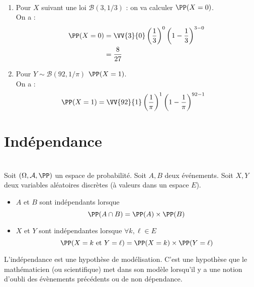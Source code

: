\documentclass[12pt,fleqn]{report} %
\begin{document}
\begin{example}
	\begin{example}\text{ }\\
		\begin{enumerate}
			\item Pour $X$ suivant une loi $\mathcal{B}(3,1/3)$ : on va calculer $\PP(X = 0)$. \\
			On a : 
			\begin{align*}
			\PP(X = 0) & = \VV{3}{0}\left(\frac{1}{3}\right)^0 \left(1 - \frac{1}{3}\right)^{3 - 0} \\ 
			& = \frac{8}{27}
			\end{align*}
			\item Pour $Y \sim \mathcal{B}(92,1/\pi)$ $\PP(X = 1)$.\\
			On a :
			\begin{align*}
			\PP(X = 1) & = \VV{92}{1} \left( \frac{1}{\pi} \right)^1 \left( 1 - \frac{1}{\pi}\right)^{92 - 1}
			\end{align*}
		\end{enumerate}	
	\end{example}
	
	
	\section{Indépendance}		
	
	\begin{definition}\text{ }\\
		Soit $(\Omega,\mathcal{A},\PP)$ un espace de probabilité.
		Soit $A,B$ deux événements. Soit $X,Y$ deux variables aléatoires discrètes (à valeurs dans un espace $E$).
		\begin{itemize}
			\item $A$ et $B$ sont indépendants lorsque \[\PP(A \cap B) = \PP(A) \times \PP(B)\]
			\item $X$ et $Y$ sont indépendantes lorsque $\forall k,\ell \in E$  
			\[\PP(X = k \text{ et } Y = \ell) = \PP(X = k)\times \PP(Y = \ell)\]
		\end{itemize}
	\end{definition}
	\begin{remark}
		L'indépendance est une hypothèse de modélisation. C'est une hypothèse que le mathématicien (ou scientifique) met dans son modèle lorsqu'il y a une notion d'oubli des évènements précédents ou de non dépendance. 
	\end{remark}	
	

\end{example}
\end{document}

